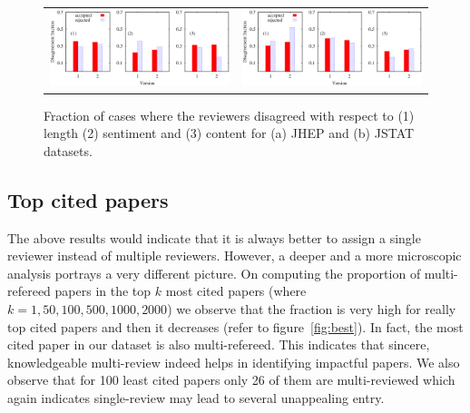 \begin{figure}
\centering
\begin{tabular}{cc}
\includegraphics[scale = 0.26]{./texfiles/Chapter_4/cikm_17/figures/jhep_all.eps} & \includegraphics[scale = 0.26]{./texfiles/Chapter_4/cikm_17/figures/jstat_all.eps}
\end{tabular}
\caption{\label{disagree:jhep} Fraction of cases where the reviewers disagreed with respect to (1) length (2) sentiment and (3) content for (a) JHEP and (b) JSTAT 
  datasets.}
  \vspace{4mm}
\end{figure}  

\subsection{Top cited papers}

The above results would indicate that it is always better to assign a single reviewer instead of multiple reviewers. However, 
a deeper and a more microscopic analysis portrays a very different picture. 
On  computing the proportion of multi-refereed papers in the top $k$ most cited papers (where $k = 1,50,100,500,1000,2000$) we observe that the 
fraction is very high for really top cited papers and then it decreases (refer to figure~\ref{fig:best}).
In fact, the most cited paper in our dataset is also multi-refereed.  
This indicates that sincere, knowledgeable multi-review indeed helps in identifying impactful papers. 
We also observe that for 100 least cited papers only 26 of them are 
multi-reviewed which again indicates single-review may lead to several unappealing entry. 


